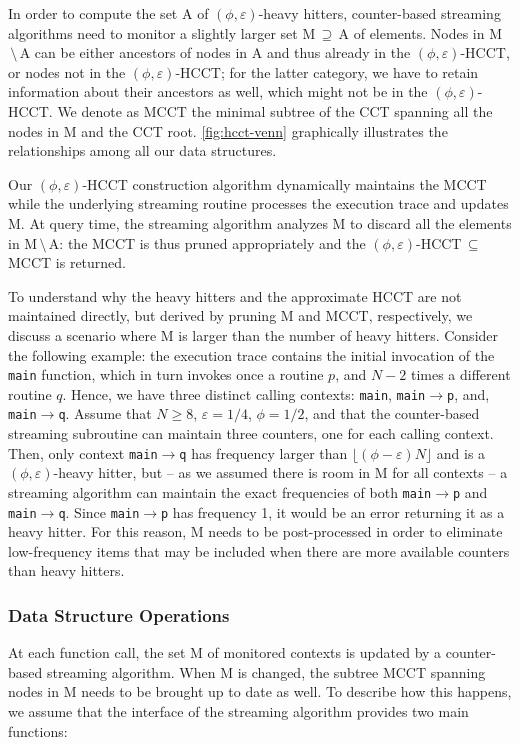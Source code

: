 In order to compute the set A of $(\phi,\varepsilon)$-heavy hitters, counter-based streaming algorithms need to monitor a slightly larger set M$\,\supseteq\,$A of elements. Nodes in M$\,\setminus\,$A can be either ancestors of nodes in A and thus already in the $(\phi,\varepsilon)$-HCCT, or nodes not in the $(\phi,\varepsilon)$-HCCT; for the latter category, we have to retain information about their ancestors as well, which might not be in the $(\phi,\varepsilon)$-HCCT. We denote as MCCT the minimal subtree of the CCT spanning all the nodes in M and the CCT root. \myfigure\ref{fig:hcct-venn} graphically illustrates the relationships among all our data structures.

Our $(\phi,\varepsilon)$-HCCT construction algorithm dynamically maintains the MCCT while the underlying streaming routine processes the execution trace and updates M. At query time, the streaming algorithm analyzes M to discard all the elements in M$\,\setminus\,$A: the MCCT is thus pruned appropriately and the $(\phi,\varepsilon)$-HCCT$\,\subseteq\,$MCCT is returned.

\begin{example}
To understand why the heavy hitters and the approximate HCCT are not maintained directly, but derived by pruning M and MCCT, respectively, we discuss a scenario where M is larger than the number of heavy hitters. Consider the following example: the execution trace contains the initial invocation of the {\tt main} function, which in turn invokes once a routine $p$, and $N-2$ times a different routine $q$. Hence, we have three distinct calling contexts: {\tt main}, {\tt main}$\rightarrow${\tt p}, and, {\tt main}$\rightarrow${\tt q}. Assume that $N\ge 8$, $\varepsilon=1/4$, $\phi=1/2$, and that the counter-based streaming subroutine can maintain three counters, one for each calling context. Then, only context {\tt main}$\rightarrow${\tt q} has frequency larger than $\lfloor(\phi-\varepsilon)N\rfloor$ and is a $(\phi,\varepsilon)$-heavy hitter, but -- as we assumed there is room in M for all contexts -- a streaming algorithm can maintain the exact frequencies of both {\tt main}$\rightarrow${\tt p} and {\tt main}$\rightarrow${\tt q}. Since {\tt main}$\rightarrow${\tt p} has frequency 1, it would be an error returning it as a heavy hitter. For this reason, M needs to be post-processed in order to eliminate low-frequency items that may be included when there are more available counters than heavy hitters.
\end{example}

\subsubsection*{Data Structure Operations}
At each function call, the set M of monitored contexts is updated by a counter-based streaming algorithm. When M is changed, the subtree MCCT spanning nodes in M needs to be brought up to date as well. To describe how this happens, we assume that the interface of the streaming algorithm provides two main functions:

